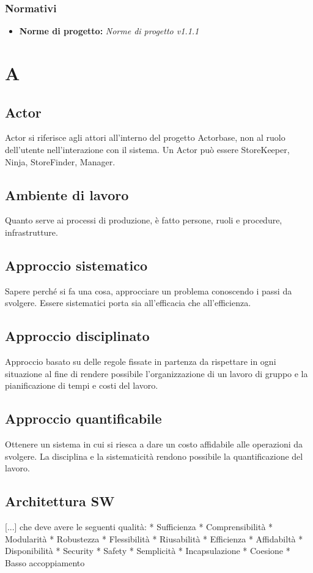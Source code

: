 \documentclass[a4paper]{report}
\newcommand{\mychapter}[2]{
	\setcounter{chapter}{#1}
	\setcounter{section}{0}
	\setcounter{subsection}{1}
	\chapter*{#2}
	\addcontentsline{toc}{chapter}{#2}
}
\begin{document}
	\subsection{Normativi}
		\begin{itemize}
			\item \textbf{Norme di progetto:} \emph{Norme di progetto v1.1.1}
		\end{itemize}
		


\mychapter{1}{A}
\section{Actor} Actor si riferisce agli attori all'interno del progetto Actorbase, non al ruolo dell'utente nell'interazione con il sistema. Un Actor può essere StoreKeeper, Ninja, StoreFinder, Manager.
\section{Ambiente di lavoro} Quanto serve ai processi di produzione, è fatto persone, ruoli e procedure, infrastrutture.
\section{Approccio sistematico} Sapere perché si fa una cosa, approcciare un problema conoscendo i passi da svolgere. Essere sistematici porta sia all’efficacia che all’efficienza.
\section{Approccio disciplinato} Approccio basato su delle regole fissate in partenza da rispettare in ogni situazione al fine di rendere possibile l’organizzazione di un lavoro di gruppo e la pianificazione di tempi e costi del lavoro.
\section{Approccio quantificabile} Ottenere un sistema in cui si riesca a dare un costo affidabile alle operazioni da svolgere. La disciplina e la sistematicità rendono possibile la quantificazione del lavoro.
\section{Architettura SW} [...] che deve avere le seguenti qualità:
  * Sufficienza
  * Comprensibilità
  * Modularità
  * Robustezza 
  * Flessibilità
  * Riusabilità
  * Efficienza
  * Affidabiltà
  * Disponibilità
  * Security
  * Safety
  * Semplicità
  * Incapsulazione
  * Coesione
  * Basso accoppiamento 
\end{document}
